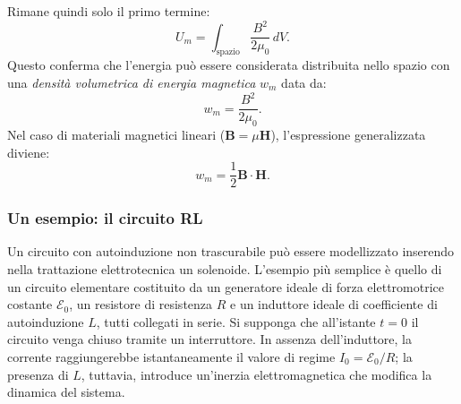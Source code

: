 \documentclass[a4paper,11pt]{report}
\begin{document}
\begin{approfondimento}[colback=white, colframe=blue!60, no shadow, title=Generalizzazione: l'energia del campo magnetico]
Rimane quindi solo il primo termine:
\begin{equation}
U_m = \int_{\text{spazio}} \frac{B^2}{2\mu_0} \, dV.
\end{equation}
Questo conferma che l'energia può essere considerata distribuita nello spazio con una \textit{densità volumetrica di energia magnetica} $w_m$ data da:
\begin{equation}
w_m = \frac{B^2}{2\mu_0}.
\end{equation}
Nel caso di materiali magnetici lineari ($\bm{B} = \mu \bm{H}$), l'espressione generalizzata diviene:
\begin{equation}
w_m = \frac{1}{2} \bm{B} \cdot \bm{H}.
\end{equation}
\end{approfondimento}

\subsubsection{Un esempio: il circuito RL}
Un circuito con autoinduzione non trascurabile può essere modellizzato inserendo nella trattazione elettrotecnica un solenoide. L'esempio più semplice è quello di un circuito elementare costituito da un generatore ideale di forza elettromotrice costante $\mathcal{E}_0$, un resistore di resistenza $R$ e un induttore ideale di coefficiente di autoinduzione $L$, tutti collegati in serie.
Si supponga che all'istante $t=0$ il circuito venga chiuso tramite un interruttore. In assenza dell'induttore, la corrente raggiungerebbe istantaneamente il valore di regime $I_0 = \mathcal{E}_0/R$; la presenza di $L$, tuttavia, introduce un'inerzia elettromagnetica che modifica la dinamica del sistema.
\end{document}
